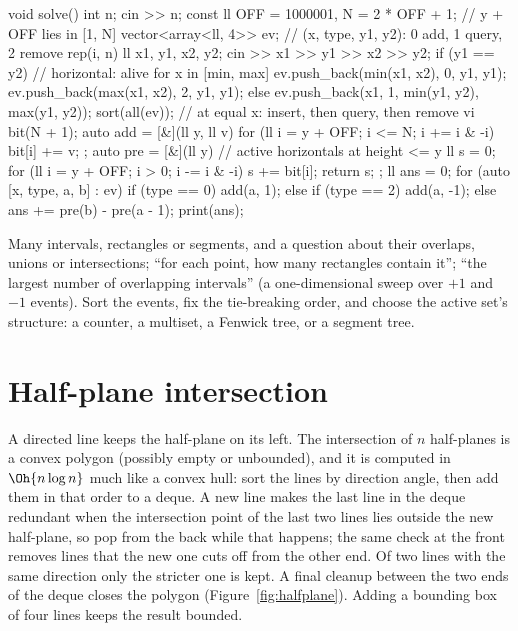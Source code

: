 \begin{code}
void solve() {
    int n;
    cin >> n;
    const ll OFF = 1000001, N = 2 * OFF + 1;  // y + OFF lies in [1, N]
    vector<array<ll, 4>> ev;  // (x, type, y1, y2): 0 add, 1 query, 2 remove
    rep(i, n) {
        ll x1, y1, x2, y2;
        cin >> x1 >> y1 >> x2 >> y2;
        if (y1 == y2) {  // horizontal: alive for x in [min, max]
            ev.push_back({min(x1, x2), 0, y1, y1});
            ev.push_back({max(x1, x2), 2, y1, y1});
        } else ev.push_back({x1, 1, min(y1, y2), max(y1, y2)});
    }
    sort(all(ev));  // at equal x: insert, then query, then remove
    vi bit(N + 1);
    auto add = [&](ll y, ll v) {
        for (ll i = y + OFF; i <= N; i += i & -i) bit[i] += v;
    };
    auto pre = [&](ll y) {  // active horizontals at height <= y
        ll s = 0;
        for (ll i = y + OFF; i > 0; i -= i & -i) s += bit[i];
        return s;
    };
    ll ans = 0;
    for (auto [x, type, a, b] : ev) {
        if (type == 0) add(a, 1);
        else if (type == 2) add(a, -1);
        else ans += pre(b) - pre(a - 1);
    }
    print(ans);
}
\end{code}

\begin{recognize}
Many intervals, rectangles or segments, and a question about their overlaps, unions or intersections; ``for each point, how many
rectangles contain it''; ``the largest number of overlapping intervals'' (a one-dimensional sweep over $+1$ and $-1$ events). Sort the
events, fix the tie-breaking order, and choose the active set's structure: a counter, a multiset, a Fenwick tree, or a segment tree.
\end{recognize}

\section[Half-plane intersection]{Half-plane intersection \hfill \ioi}\label{sec:halfplane}

A directed line keeps the half-plane on its left. The intersection of $n$ half-planes is a convex polygon (possibly empty or unbounded),
and it is computed in $\Oh{n \log n}$ much like a convex hull: sort the lines by direction angle, then add them in that order to a deque.
A new line makes the last line in the deque redundant when the intersection point of the last two lines lies outside the new half-plane,
so pop from the back while that happens; the same check at the front removes lines that the new one cuts off from the other end. Of two
lines with the same direction only the stricter one is kept. A final cleanup between the two ends of the deque closes the polygon
(Figure~\ref{fig:halfplane}). Adding a bounding box of four lines keeps the result bounded.

